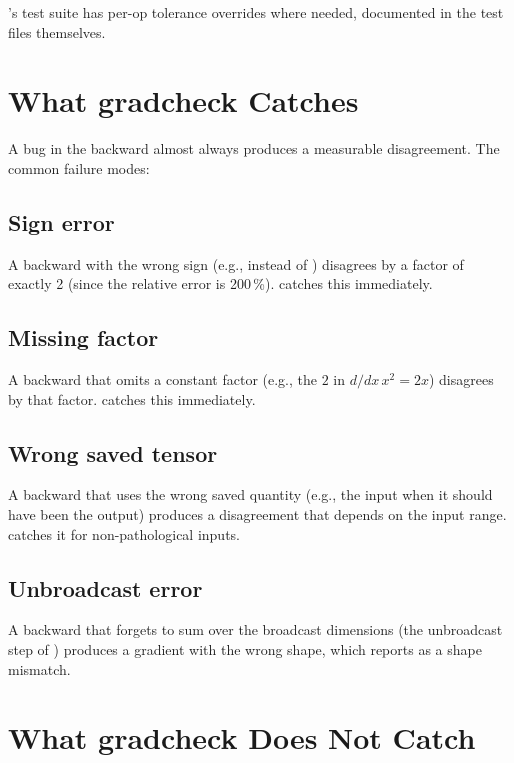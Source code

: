 \Lucid's test suite has per-op tolerance overrides where needed,
documented in the test files themselves.

\section{What gradcheck Catches}
\label{sec:gradcheck:catches}

A bug in the backward almost always produces a measurable
disagreement. The common failure modes:

\subsection{Sign error}
\label{ssec:gradcheck:sign_error}

A backward with the wrong sign (e.g., 
instead of ) disagrees by a factor of
exactly 2 (since the relative error is 200\,\%). 
catches this immediately.

\subsection{Missing factor}
\label{ssec:gradcheck:missing_factor}

A backward that omits a constant factor (e.g., the $2$ in
$d/dx\, x^2 = 2x$) disagrees by that factor. 
catches this immediately.

\subsection{Wrong saved tensor}
\label{ssec:gradcheck:wrong_saved}

A backward that uses the wrong saved quantity (e.g., the input
when it should have been the output) produces a disagreement that
depends on the input range.  catches it for
non-pathological inputs.

\subsection{Unbroadcast error}
\label{ssec:gradcheck:unbroadcast_error}

A backward that forgets to sum over the broadcast dimensions (the
unbroadcast step of ) produces a
gradient with the wrong shape, which  reports as
a shape mismatch.

\section{What gradcheck Does Not Catch}
\label{sec:gradcheck:misses}

